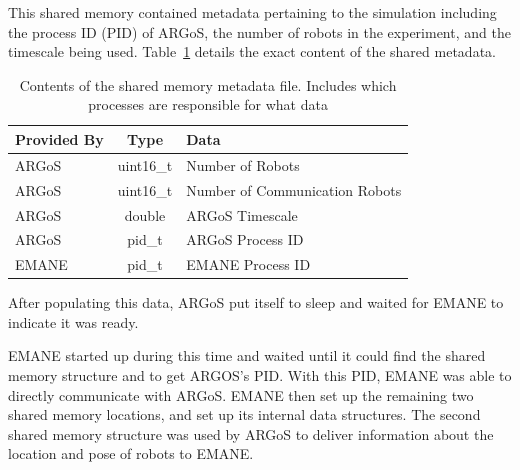 This shared memory contained metadata pertaining to the simulation including the process ID (PID) of ARGoS, the number of robots in the experiment, and the timescale being used.
Table~\ref{shm_meta} details the exact content of the shared metadata.
\begin{table}[!ht]
\centering
\caption{Contents of the shared memory metadata file. Includes which processes are responsible for what data}
\begin{adjustbox}{width=0.8\textwidth, center=\textwidth}
	\begin{tabular}{l|c|l}
		\multicolumn{1}{c|}{Provided By} & Type & Data \\ 
		\hline
		ARGoS & uint16\_t & Number of Robots \\
		ARGoS & uint16\_t & Number of Communication Robots \\
		ARGoS & double & ARGoS Timescale \\
		ARGoS & pid\_t & ARGoS Process ID \\
		EMANE & pid\_t & EMANE Process ID
	\end{tabular}
\end{adjustbox}
\label{shm_meta}
\end{table}
After populating this data, ARGoS put itself to sleep and waited for EMANE to indicate it was ready.\par
EMANE started up during this time and waited until it could find the shared memory structure and to get ARGOS's PID.
With this PID, EMANE was able to directly communicate with ARGoS.
EMANE then set up the remaining two shared memory locations, and set up its internal data structures.
The second shared memory structure was used by ARGoS to deliver information about the location and pose of robots to EMANE.
